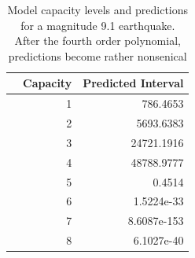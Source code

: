 \begin{table}[ht]
\centering
\begin{tabular}{rrr}
  \hline
 & Capacity & Predicted Interval \\ 
  \hline
& 1 & 786.4653 \\ 
& 2 & 5693.6383 \\ 
& 3 & 24721.1916 \\ 
& 4 & 48788.9777 \\ 
& 5 & 0.4514 \\ 
& 6 & 1.5224e-33 \\ 
& 7 & 8.6087e-153 \\ 
& 8 & 6.1027e-40 \\ 
   \hline
\end{tabular}
\caption{\footnotesize Model capacity levels and predictions for a magnitude 9.1 earthquake.  After the fourth order polynomial, predictions become rather nonsenical}
\label{captable}
\end{table}

